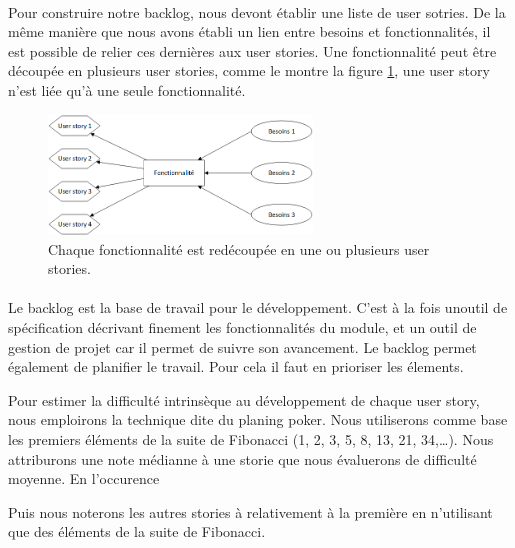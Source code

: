 			\paragraph{}%
			
			
			Pour construire notre backlog, nous devont établir une liste de user sotries.
			De la même manière que nous avons établi un lien entre besoins et
			fonctionnalités, il est possible de relier ces dernières aux user stories.
			Une fonctionnalité peut être découpée en plusieurs user stories, comme le
			montre la figure \ref{mapping_fonctios_us}, une user story n'est liée qu'à
			une seule fonctionnalité.
			\begin{figure}[H]%
				\centering
				\includegraphics[width=7cm]{../img/part3/mapping_fonctios_us.png}
				\caption{\label{mapping_fonctios_us} Chaque fonctionnalité est redécoupée
				en une ou plusieurs user stories.}
			\end{figure}
			
			\paragraph{}%
			Le backlog est la base de travail pour le développement. C'est à la fois
			unoutil de spécification décrivant finement les fonctionnalités du module, et
			un outil de gestion de projet car il permet de suivre son avancement. Le
			backlog permet également de planifier le travail. Pour cela il faut en
			prioriser les élements.\newline
			
			
			Pour estimer la difficulté intrinsèque au développement de chaque user story,
			nous emploirons la technique dite du planing poker. Nous utiliserons comme
			base les premiers éléments de la suite de Fibonacci (1, 2, 3, 5, 8, 13, 21,
			34,\ldots). Nous attriburons une note médianne à une storie que nous
			évaluerons de difficulté moyenne. En l'occurence %
			
			Puis nous noterons les autres stories à relativement à la première en
			n'utilisant que des éléments de la suite de Fibonacci.
			
